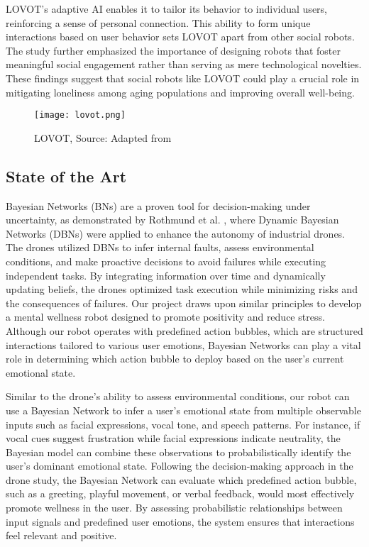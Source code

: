 \begin{enumerate}
LOVOT's adaptive AI enables it to tailor its behavior to individual users, reinforcing a sense of personal connection. This ability to form unique interactions based on user behavior sets LOVOT apart from other social robots. The study further emphasized the importance of designing robots that foster meaningful social engagement rather than serving as mere technological novelties. These findings suggest that social robots like LOVOT could play a crucial role in mitigating loneliness among aging populations and improving overall well-being.
\end{enumerate}


\begin{figure}[ht]
    \centering
    \texttt{[image: lovot.png]}
    \caption{LOVOT, Source: Adapted from \cite{lovot2024}}
    \label{fig:lovot}
\end{figure}

\subsection{State of the Art}

Bayesian Networks (BNs) are a proven tool for decision-making under uncertainty, as demonstrated by Rothmund et al. \cite{rothmund2021bayesian}, where Dynamic Bayesian Networks (DBNs) were applied to enhance the autonomy of industrial drones. The drones utilized DBNs to infer internal faults, assess environmental conditions, and make proactive decisions to avoid failures while executing independent tasks. By integrating information over time and dynamically updating beliefs, the drones optimized task execution while minimizing risks and the consequences of failures. Our project draws upon similar principles to develop a mental wellness robot designed to promote positivity and reduce stress. Although our robot operates with predefined action bubbles, which are structured interactions tailored to various user emotions, Bayesian Networks can play a vital role in determining which action bubble to deploy based on the user’s current emotional state.

Similar to the drone’s ability to assess environmental conditions, our robot can use a Bayesian Network to infer a user’s emotional state from multiple observable inputs such as facial expressions, vocal tone, and speech patterns. For instance, if vocal cues suggest frustration while facial expressions indicate neutrality, the Bayesian model can combine these observations to probabilistically identify the user’s dominant emotional state. Following the decision-making approach in the drone study, the Bayesian Network can evaluate which predefined action bubble, such as a greeting, playful movement, or verbal feedback, would most effectively promote wellness in the user. By assessing probabilistic relationships between input signals and predefined user emotions, the system ensures that interactions feel relevant and positive.

